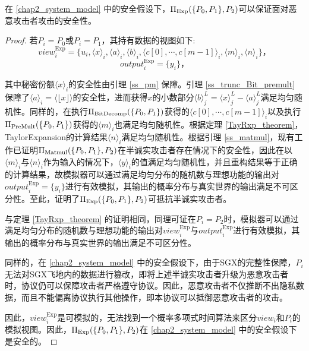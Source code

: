 \begin{theorem}
	\label{Exp_theorem}
	在 \ref{chap2_system_model} 中的安全假设下，$\Pi_{\rm Exp}(\{P_0, P_1\}, P_2)$可以保证面对恶意攻击者攻击的安全性。
\end{theorem}

\begin{proof}
	若$P_i=P_0$或$P_i=P_1$，其持有数据的视图如下:
	$$view_i^{\text{Exp}}=\{u_i, \langle x\rangle_i,\langle a\rangle_i, \langle b\rangle_i, \langle c[0],\cdots, c[m-1]\rangle_i,\langle m\rangle_i,\langle n\rangle_i\}\text{，}$$
	$$output_i^{\text{Exp}}=\{y_i\}\text{，}$$
	
	其中秘密份额$\langle x\rangle_i$的安全性由引理 \ref{ss_pm} 保障。引理 \ref{ss_trunc_Bit_premult} 保障了$\langle a\rangle_i=\langle \lfloor x \rfloor \rangle$的安全性，进而获得$x$的小数部分$\langle b\rangle_j^L = \langle x\rangle_j^L - \langle a\rangle_j^L$满足均匀随机性。同样的，在执行$\Pi_{\rm BitDecomp}(\{P_0, P_1\})$获得的$\langle c[0],\cdots, c[m-1]\rangle_i$以及执行$\Pi_{\rm PreMult}(\{P_0, P_1\})$获得的$\langle m\rangle_i$也满足均匀随机性。根据定理 \ref{TayRxp_theorem}，TaylorExpansion的计算结果$\langle n\rangle_i$满足均匀随机性。根据引理 \ref{ss_matmul}，现有工作已证明$\Pi_{\rm Matmul}(\{P_0, P_1\}, P_2)$在半诚实攻击者存在情况下的安全性，因此在以$\langle m\rangle_i$与$\langle n\rangle_i$作为输入的情况下，$\langle y\rangle_i$的值满足均匀随机性，并且重构结果等于正确的计算结果，故模拟器可以通过满足均匀分布的随机数与理想功能的输出对$output_i^{\text{Exp}}=\{y_i\}$进行有效模拟，其输出的概率分布与真实世界的输出满足不可区分性。至此，证明了$\Pi_{\rm Exp}(\{P_0, P_1\}, P_2)$可抵抗半诚实攻击者。
	
	与定理 \ref{TayRxp_theorem} 的证明相同，同理可证在$P_i=P_2$时，模拟器可以通过满足均匀分布的随机数与理想功能的输出对$view_i^{\text{Exp}}$与$output_i^{\text{Exp}}$进行有效模拟，其输出的概率分布与真实世界的输出满足不可区分性。
	
	同样的，在 \ref{chap2_system_model} 中的安全假设下，由于SGX的完整性保障\cite{SGX_Explained}，$P_i$无法对SGX飞地内的数据进行篡改，即将上述半诚实攻击者升级为恶意攻击者时，协议仍可以保障攻击者严格遵守协议。因此，恶意攻击者不仅推断不出隐私数据，而且不能偏离协议执行其他操作，即本协议可以抵御恶意攻击者的攻击。
	
	因此，$view_i^{\text{Exp}}$是可模拟的，无法找到一个概率多项式时间算法来区分$view_i$和$P_i$的模拟视图。因此，$\Pi_{\rm Exp}(\{P_0, P_1\}, P_2)$在 \ref{chap2_system_model} 中的安全假设下是安全的。
	
\end{proof}



